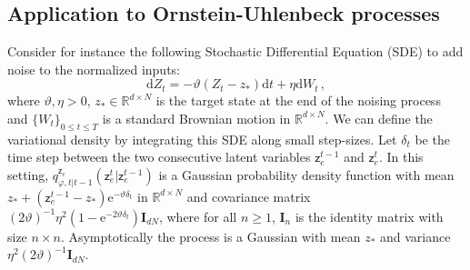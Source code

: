 \documentclass[nohyperref]{article}
\theoremstyle{plain}
\theoremstyle{definition}
\theoremstyle{remark}
\newcommand{\latentcont}{\mathsf{z}_e}
\begin{document}
\subsection{Application to Ornstein-Uhlenbeck processes}
\label{sec:OU}
Consider for instance the following Stochastic Differential Equation (SDE) to add noise to the  normalized inputs:
\begin{equation}
\label{eq:ou}
\mathrm{d}Z_t = -\vartheta (Z_t - z_*)\mathrm{d}t + \eta\mathrm{d}W_t\,,
\end{equation}
where $\vartheta, \eta>0$,  $z_*\in\mathbb{R}^{d\times N}$ is the target state at the end of the noising process and $\{W_t\}_{0\leqslant t\leqslant T}$ is a standard Brownian motion in $\mathbb{R}^{d\times N}$. We can define the variational density by integrating this SDE along small step-sizes. Let $\delta_t$ be the time step between the two consecutive latent variables $\latentcont^{t-1}$ and $\latentcont^{t}$. In this setting, $q^{\latentcont}_{\varphi,t|t-1}(\latentcont^t|\latentcont^{t-1})$ is a Gaussian probability density function with mean $z_* + (\latentcont^{t-1}-z_*)\mathrm{e}^{-\vartheta \delta_t}$ in $\mathbb{R}^{d\times N}$ and covariance matrix $(2\vartheta)^{-1}\eta^2(1-\mathrm{e}^{-2\vartheta\delta_t})\mathbf{I}_{dN}$, where for all $n\geqslant 1$, $\mathbf{I}_{n}$ is the identity matrix with size $n\times n$. Asymptotically the process is a Gaussian with mean $z_*$ and variance $\eta^2(2\vartheta)^{-1} \mathbf{I}_{dN}$.
\end{document}
